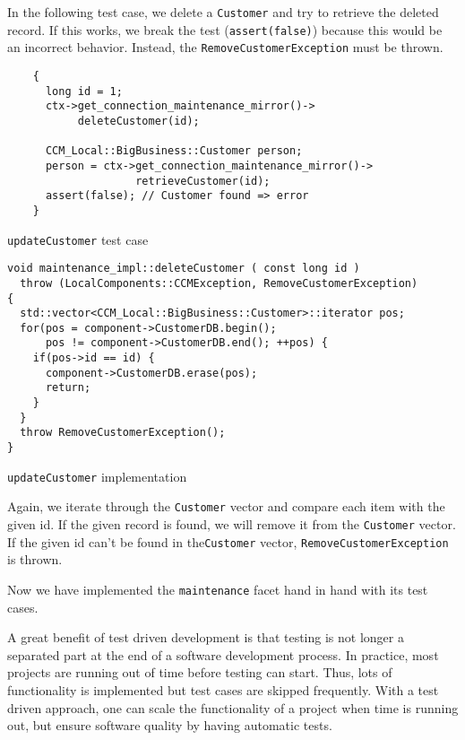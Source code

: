 \newpage
In the following test case, we delete a {\tt Customer} and try to retrieve the 
deleted record.
If this works, we break the test ({\tt assert(false)}) because this would be an
incorrect behavior. 
Instead, the {\tt RemoveCustomerException} must be thrown.
\begin{Example}
\begin{minifbox}
\begin{small}
\begin{verbatim}
    {
      long id = 1;
      ctx->get_connection_maintenance_mirror()->
           deleteCustomer(id);

      CCM_Local::BigBusiness::Customer person;
      person = ctx->get_connection_maintenance_mirror()->
                    retrieveCustomer(id);
      assert(false); // Customer found => error
    }
\end{verbatim}
\end{small}
\end{minifbox}
\caption{{\tt updateCustomer} test case}
\label{example:}
\end{Example}


\begin{Example}
\begin{minifbox}
\begin{small}
\begin{verbatim}
void maintenance_impl::deleteCustomer ( const long id )
  throw (LocalComponents::CCMException, RemoveCustomerException)
{
  std::vector<CCM_Local::BigBusiness::Customer>::iterator pos;
  for(pos = component->CustomerDB.begin(); 
      pos != component->CustomerDB.end(); ++pos) {
    if(pos->id == id) {
      component->CustomerDB.erase(pos);
      return;
    }
  }
  throw RemoveCustomerException();  
}
\end{verbatim}
\end{small}
\end{minifbox}
\caption{{\tt updateCustomer} implementation}
\label{example:}
\end{Example}

Again, we iterate through the {\tt Customer} vector and compare each item with 
the given id.
If the given record is found, we will remove it from the {\tt Customer} vector.
If the given id can't be found in the{\tt Customer} vector, 
{\tt RemoveCustomerException} is thrown.

Now we have implemented the {\tt maintenance} facet hand in hand with its test 
cases. 

A great benefit of test driven development is that testing is not longer a 
separated part at the end of a software development process.
In practice, most projects are running out of time before testing can start. 
Thus, lots of functionality is implemented but test cases are skipped 
frequently.
With a test driven approach, one can scale the functionality of a project when 
time is running out, but ensure software quality by having automatic tests.

